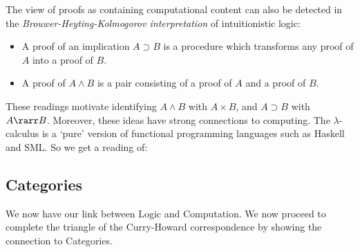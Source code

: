 \documentclass[12pt]{article}
\begin{document}
%
The view of proofs as containing computational content can also be detected in the \emph{Brouwer-Heyting-Kolmogorov interpretation} of intuitionistic
logic:
\begin{itemize}
\item A proof of an implication $A \supset B$ is a procedure which transforms any proof of $A$ into a proof of $B$.
\item A proof of $A \wedge B$ is a pair consisting of a proof of $A$  and a proof of $B$.
\end{itemize}
These readings motivate identifying $A \wedge B$ with $A \times B$, and $A \supset B$ with $A \rarr B$.
%
Moreover, these ideas have strong connections to computing. The $\lambda$-calculus is a `pure' version of functional programming languages such as
Haskell and SML. So we get a reading of:
\begin{center}
\end{center}


\subsection{Categories}
We now have our link between Logic and Computation. We now proceed to complete the triangle of the Curry-Howard correspondence by showing the connection to Categories.
\end{document}
